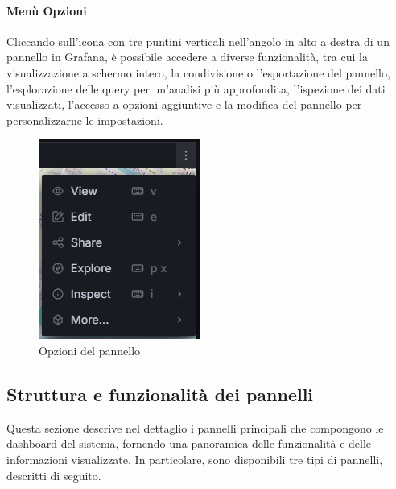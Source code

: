 \documentclass[10pt]{article}
\begin{document}
\begin{justify}
    \paragraph{Menù Opzioni}
    Cliccando sull'icona con tre puntini verticali nell'angolo in alto a destra di un pannello in Grafana, è possibile accedere a diverse funzionalità, tra cui la visualizzazione a schermo intero, la condivisione o l'esportazione del pannello, l'esplorazione delle query per un'analisi più approfondita, l'ispezione dei dati visualizzati, l'accesso a opzioni aggiuntive e la modifica del pannello per personalizzarne le impostazioni.
    \begin{figure}[H]
    \centering
    \includegraphics[width=0.25\linewidth]{opzioni.png}
    \caption{Opzioni del pannello}
    \end{figure}

\subsection{Struttura e funzionalità dei pannelli}
Questa sezione descrive nel dettaglio i pannelli principali che compongono le dashboard del sistema, fornendo una panoramica delle funzionalità e delle informazioni visualizzate. In particolare, sono disponibili tre tipi di pannelli, descritti di seguito.


\end{justify}
\end{document}
